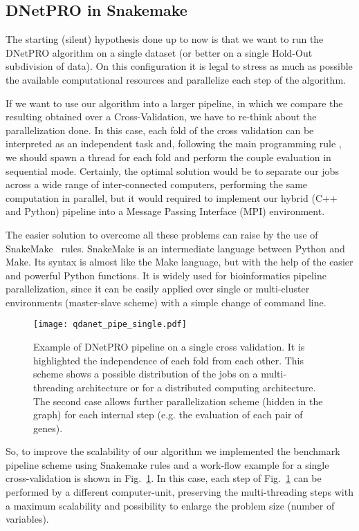 \documentclass{standalone}
\begin{document}
\subsection[Pipeline]{DNetPRO in Snakemake}\label{implementation:snakemake}

The starting (silent) hypothesis done up to now is that we want to run the \textsf{DNetPRO} algorithm on a single dataset (or better on a single Hold-Out subdivision of data).
On this configuration it is legal to stress as much as possible the available computational resources and parallelize each step of the algorithm.

If we want to use our algorithm into a larger pipeline, in which we compare the resulting obtained over a Cross-Validation, we have to re-think about the parallelization done.
In this case, each fold of the cross validation can be interpreted as an independent task and, following the main programming rule \emph{}, we should spawn a thread for each fold and perform the couple evaluation in sequential mode.
Certainly, the optimal solution would be to separate our jobs across a wide range of inter-connected computers, performing the same computation in parallel, but it would required to implement our hybrid (\textsf{C++} and \textsf{Python}) pipeline into a Message Passing Interface (MPI) environment.

The easier solution to overcome all these problems can raise by the use of \textsf{SnakeMake}~\cite{snakemake} rules.
\textsf{SnakeMake} is an intermediate language between \textsf{Python} and \textsf{Make}.
Its syntax is almost like the \textsf{Make} language, but with the help of the easier and powerful \textsf{Python} functions.
It is widely used for bioinformatics pipeline parallelization, since it can be easily applied over single or multi-cluster environments (master-slave scheme) with a simple change of command line.

\begin{center}
\begin{figure}[htbp]
\hspace{-2cm}
\texttt{[image: qdanet\_pipe\_single.pdf]}
\caption{Example of \textsf{DNetPRO} pipeline on a single cross validation.
It is highlighted the independence of each fold from each other.
This scheme shows a possible distribution of the jobs on a multi-threading architecture or for a distributed computing architecture.
The second case allows further parallelization scheme (hidden in the graph) for each internal step (e.g. the evaluation of each pair of genes).
}
\label{fig:dnet_workflow}
\end{figure}
\end{center}

So, to improve the scalability of our algorithm we implemented the benchmark pipeline scheme using Snakemake rules and a work-flow example for a single cross-validation is shown in Fig.~\ref{fig:dnet_workflow}.
In this case, each step of Fig.~\ref{fig:dnet_workflow} can be performed by a different computer-unit, preserving the multi-threading steps with a maximum scalability and possibility to enlarge the problem size (number of variables).
\end{document}
